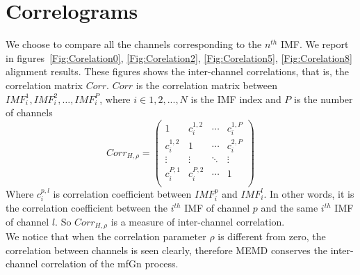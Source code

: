 \documentclass[oneside,11pt]{paper}
\begin{document}
\section{Correlograms}
We choose to compare all the channels corresponding to the $n^{th}$ IMF. We report in figures~\ref{Fig:Corelation0}, \ref{Fig:Corelation2}, \ref{Fig:Corelation5}, \ref{Fig:Corelation8} alignment results. These figures shows the inter-channel correlations, that is, the correlation matrix $Corr$. $Corr$ is the correlation matrix between $IMF_i^1,  IMF_i^2, \ldots, IMF_i^P$, where $i \in {1, 2, ..., N}$ is the IMF index and $P$ is the number of channels
%  
\[
Corr_{H,\rho} = 
 \begin{pmatrix}
  1 		& 	c_i^{1,2}	 & 	\cdots	  & 	c_i^{1,P} \\
  c_i^{1,2} &      1		 &  \cdots    &     c_i^{2,P} \\
  \vdots    &      \vdots    &  \ddots    &    \vdots    \\
  c_i^{P,1} &   c_i^{P,2}	 &  \cdots    &      1 \\
 \end{pmatrix}  
\]
Where $c_i^{p,l}$ is correlation coefficient between $IMF_i^p$ and $IMF_i^l$. In other words, it is the correlation coefficient between the $i^{th}$ IMF of channel $p$ and the same $i^{th}$ IMF of channel $l$. So $Corr_{H,\rho} $ is a measure of inter-channel correlation.\\
We notice that when the correlation parameter $\rho$ is different from zero, the correlation between channels is seen clearly, therefore MEMD conserves the inter-channel correlation of the mfGn process.
\end{document}
